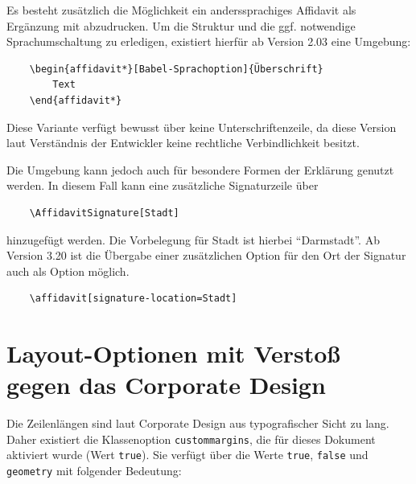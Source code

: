 \documentclass[
	ngerman,%
	accentcolor=9c,%
	ruledheaders=chapter,%
	class=book,%
	thesis={%
		type=dr,
		dr=rernat
	},
	fontsize=11pt,%
	parskip=half-,%
	custommargins=true,%
	marginpar=false,%
]{tudapub}
\newcommand*{\code}[1]{\texttt{#1}}
\begin{document}
Es besteht zusätzlich die Möglichkeit ein anderssprachiges Affidavit als Ergänzung mit abzudrucken. Um die Struktur und die ggf. notwendige Sprachumschaltung zu erledigen, existiert hierfür ab Version 2.03 eine Umgebung:

\begin{verbatim}
    \begin{affidavit*}[Babel-Sprachoption]{Überschrift}
        Text
    \end{affidavit*}
\end{verbatim}

Diese Variante verfügt bewusst über keine Unterschriftenzeile, da diese Version laut Verständnis der Entwickler keine rechtliche Verbindlichkeit besitzt.

Die Umgebung kann jedoch auch für besondere Formen der Erklärung genutzt werden. In diesem Fall kann eine zusätzliche Signaturzeile über
\begin{verbatim}
    \AffidavitSignature[Stadt]
\end{verbatim}
hinzugefügt werden. Die Vorbelegung für Stadt ist hierbei \enquote{Darmstadt}.
Ab Version 3.20 ist die Übergabe einer zusätzlichen Option für den Ort der Signatur auch als Option möglich.

\begin{verbatim}
    \affidavit[signature-location=Stadt]
\end{verbatim}

\section{Layout-Optionen mit Verstoß gegen das Corporate Design}

Die Zeilenlängen sind laut Corporate Design aus typografischer Sicht zu lang.
Daher existiert die Klassenoption \code{custommargins}, die für dieses Dokument aktiviert wurde (Wert \code{true}). Sie verfügt über die Werte \code{true}, \code{false} und \code{geometry} mit folgender Bedeutung:
\end{document}
